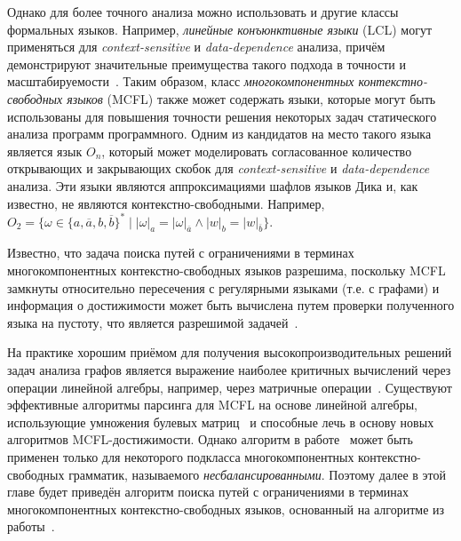 Однако для более точного анализа можно использовать и другие классы формальных языков. Например, \textit{линейные конъюнктивные языки} (LCL) могут применяться для \textit{context-sensitive} и \textit{data-dependence} анализа, причём демонстрируют значительные преимущества такого подхода в точности и масштабируемости~. Таким образом, класс \textit{многокомпонентных контекстно-свободных языков} (MCFL) также может содержать языки, которые могут быть использованы для повышения точности решения некоторых задач статического анализа программ программного. Одним из кандидатов на место такого языка является язык $O_n$, который может моделировать согласованное количество открывающих и закрывающих скобок для \textit{context-sensitive} и \textit{data-dependence} анализа. Эти языки являются аппроксимациями шафлов языков Дика и, как известно, не являются контекстно-свободными. Например, $O_2=\{\omega \in \{a,\overline{a},b,\overline{b}\}^* \mid |\omega|_a=|\omega|_{\overline{a}} \wedge |w|_b=|w|_{\overline{b}}\}$.


Известно, что задача поиска путей с ограничениями в терминах многокомпонентных контекстно-свободных языков разрешима, поскольку MCFL замкнуты относительно пересечения с регулярными языками (т.е. с графами) и информация о достижимости может быть вычислена путем проверки полученного языка на пустоту, что является разрешимой задачей~.

На практике хорошим приёмом для получения высокопроизводительных решений задач анализа графов является выражение наиболее критичных вычислений через операции линейной алгебры, например, через матричные операции~. Существуют эффективные алгоритмы парсинга для MCFL на основе линейной алгебры, использующие умножения булевых матриц~ и способные лечь в основу новых алгоритмов MCFL-достижимости. Однако алгоритм в работе~ может быть применен только для некоторого подкласса многокомпонентных контекстно-свободных грамматик, называемого \textit{несбалансированными}. Поэтому далее в этой главе будет приведён алгоритм поиска путей с ограничениями в терминах многокомпонентных контекстно-свободных языков, основанный на алгоритме из работы~.
